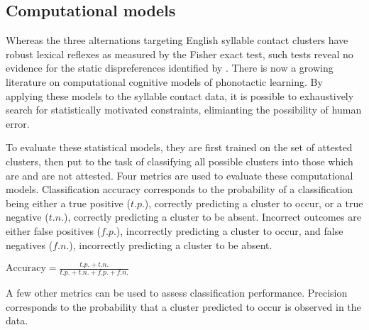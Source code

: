 \subsection{Computational models}

Whereas the three alternations targeting English syllable contact clusters have robust lexical reflexes as measured by the Fisher exact test, such tests reveal no evidence for the static dispreferences identified by \citeauthor{Pierrehumbert1994}. There is now a growing literature on computational cognitive models of phonotactic learning. By applying these models to the syllable contact data, it is possible to exhaustively search for statistically motivated constraints, elimianting the possibility of human error. 

To evaluate these statistical models, they are first trained on the set of attested clusters, then put to the task of classifying all possible clusters into those which are and are not attested. Four metrics are used to evaluate these computational models. Classification accuracy corresponds to the probability of a classification being either a true positive ($t.p.$), correctly predicting a cluster to occur, or a true negative ($t.n.$), correctly predicting a cluster to be absent. Incorrect outcomes are either false positives ($f.p.$), incorrectly predicting a cluster to occur, and false negatives ($f.n.$), incorrectly predicting a cluster to be absent. 


\ex $\displaystyle \textrm{Accuracy} = \frac{t.p. + t.n.}{t.p. + t.n. + f.p. + f.n.}$ \xe

\noindent
A few other metrics can be used to assess classification performance. Precision corresponds to the probability that a cluster predicted to occur is observed in the data. 

